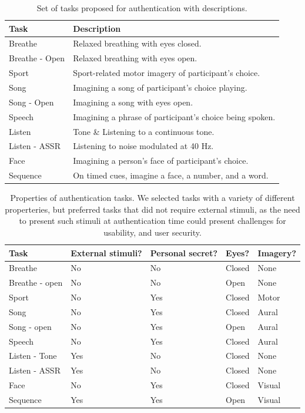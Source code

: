 \documentclass[11pt]{article}
\begin{document}
\begin{table}[h]
\centering
\begin{tabular}{ll}
\textbf{\textbf{Task}} & \textbf{\textbf{Description}}\\
\hline
Breathe & Relaxed breathing with eyes closed.\\
Breathe - Open & Relaxed breathing with eyes open.\\
Sport & Sport-related motor imagery of participant's choice.\\
Song & Imagining a song of participant's choice playing.\\
Song - Open & Imagining a song with eyes open.\\
Speech & Imagining a phrase of participant's choice being spoken.\\
Listen & Tone \& Listening to a continuous tone.\\
Listen - ASSR & Listening to noise modulated at 40 Hz.\\
Face & Imagining a person's face of participant's choice.\\
Sequence & On timed cues, imagine a face, a number, and a word.\\
\hline
\end{tabular}
\caption{Set of tasks proposed for authentication with descriptions.}
\end{table}

\begin{table}[h]
\centering
\begin{tabular}{lllll}
Task & External stimuli? & Personal secret? & Eyes? & Imagery?\\
\hline
Breathe & No & No & Closed & None\\
Breathe - open & No & No & Open & None\\
Sport & No & Yes & Closed & Motor\\
Song & No & Yes & Closed & Aural\\
Song - open & No & Yes & Open & Aural\\
Speech & No & Yes & Closed & Aural\\
Listen - Tone & Yes & No & Closed & None\\
Listen - ASSR & Yes & No & Closed & None\\
Face & No & Yes & Closed & Visual\\
Sequence & Yes & Yes & Open & Visual\\
\hline
\end{tabular}
\caption{Properties of authentication tasks. We selected tasks with a variety of different properteries, but preferred tasks that did not require external stimuli, as the need to present such stimuli at authentication time could present challenges for usability, and user security.}
\end{table}
\end{document}
